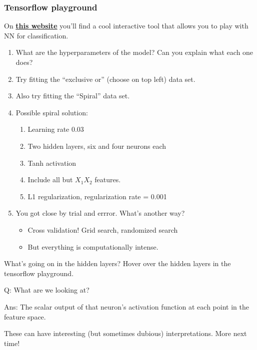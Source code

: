 \documentclass[mathserif, aspectratio=169]{beamer}
\begin{document}
\begin{frame}[t]\frametitle{Tensorflow playground}
    On \href{http://playground.tensorflow.org}{\textbf{this website}} you'll find a cool interactive tool that allows you to play with NN for classification.

    \vspace{5mm}

    \begin{enumerate}
    	\item What are the hyperparameters of the model?  Can you explain what each one does?
    	\item Try fitting the ``exclusive or'' (choose on top left) data set.
    	\item Also try fitting the ``Spiral'' data set.  
    	\item Possible spiral solution:
    	\begin{enumerate}
    		\item<2-> Learning rate 0.03
    		\item<2-> Two hidden layers, six and four neurons each
    		\item<2-> Tanh activation
    		\item<2-> Include all but $X_1X_2$ features.
    		\item<2-> L1 regularization, regularization rate = 0.001
    	\end{enumerate}
    	\item<3-> You got close by trial and errror.  What's another way?
    	\begin{itemize}
    		\item<4-> Cross validation!  Grid search, randomized search 
    		\item<4-> But everything is computationally intense.  
    	\end{itemize}
    \end{enumerate}
\end{frame}

\begin{frame}{What's going on in the hidden layers?}
	Hover over the hidden layers in the tensorflow playground.	

	\vspace{5mm}

	Q: What are we looking at?

	\pause

	\vspace{5mm}
	Ans: The scalar output of that neuron's activation function at each point in the feature space.  

	\vspace{5mm}

	These can have interesting (but sometimes dubious) interpretations.  More next time!

\end{frame}
\end{document}
